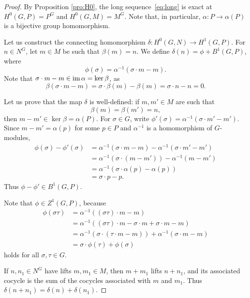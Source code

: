 \begin{proof}
    By Proposition \ref{pro:H0}, the long 
    sequence~\eqref{eq:long} is exact at $H^0(G,P)=P^G$ and  
    $H^0(G,M)=M^G$. Note that, in particular, 
    $\alpha\colon P\to\alpha(P)$ is a bijective group homomorphism. 


    Let us construct the connecting
    homomorphism $\delta\colon H^0(G,N)\to H^1(G,P)$. For 
    $n\in N^G$, let $m\in M$ be such that 
    $\beta(m)=n$. We define $\delta(n)=\phi+B^1(G,P)$, where 
    \[
    \phi(\sigma)=\alpha^{-1}(\sigma\cdot m-m).
    \]
    Note that $\sigma\cdot m-m\in\operatorname{im}\alpha=\ker\beta$, as 
    \[
    \beta(\sigma\cdot m-m)=\sigma\cdot \beta(m)-\beta(m)=\sigma\cdot n-n=0.
    \]

    Let us prove that the map $\delta$ is well-defined: if $m,m'\in M$ are such that
    \[
    \beta(m)=\beta(m')=n,
    \]
    then  $m-m'\in\ker\beta=\alpha(P)$. 
    For $\sigma\in G$, write 
    $\phi'(\sigma)=\alpha^{-1}(\sigma\cdot m'-m')$. 
    Since  
    $m-m'=\alpha(p)$ for some $p\in P$ and  
    $\alpha^{-1}$ is a homomorphism of $G$-modules, 
    \begin{align*}
    \phi(\sigma)-\phi'(\sigma)&=\alpha^{-1}(\sigma\cdot m-m)
    -\alpha^{-1}(\sigma\cdot m'-m')\\
    &=\alpha^{-1}(\sigma\cdot (m-m'))-\alpha^{-1}(m-m')\\
    &=\alpha^{-1}(\sigma\cdot\alpha(p)-\alpha(p))\\
    &=\sigma\cdot p-p.
    \end{align*}
    Thus $\phi-\phi'\in B^1(G,P)$. 

    Note that $\phi\in Z^1(G,P)$, because
    \begin{align*}
    \phi(\sigma\tau)&=\alpha^{-1}((\sigma\tau)\cdot m-m)\\
    &=\alpha^{-1}((\sigma\tau)\cdot m-\sigma\cdot m+\sigma\cdot m-m)\\
    &=\alpha^{-1}(\sigma\cdot (\tau\cdot m-m))+\alpha^{-1}(\sigma\cdot m-m)\\
    &=\sigma\cdot\phi(\tau)+\phi(\sigma)
    \end{align*}
    holds for all $\sigma,\tau\in G$. 

    If $n,n_1\in N^G$ have lifts $m,m_1\in M$, then $m+m_1$ lifts
    $n+n_1$, and its associated cocycle is the sum of the cocycles
    associated with $m$ and $m_1$. Thus
    $\delta(n+n_1)=\delta(n)+\delta(n_1)$.
    

\end{proof}
